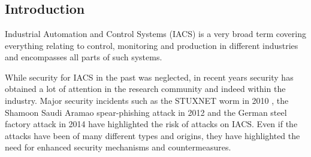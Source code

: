\chapter[\paperIVtitle]{\texorpdfstring{%
                \paperIVtitle}{%
                \paperIVtitle}}

\label{ch:digital-twin}
\paperRemark{\paperIVref}





\section{Introduction}
\label{sec:digital-twin:introduction}

Industrial Automation and Control Systems (IACS) is a very broad term covering everything relating to control, monitoring and production in different industries and encompasses all parts of such systems.

While security for IACS in the past was neglected, in recent years security has obtained a lot of attention in the research community and indeed within the industry. Major security incidents such as the STUXNET worm in 2010 \cite{Falliere2011}, the Shamoon Saudi Aramao spear-phishing attack in 2012 \cite{Leyden2012} and the German steel factory attack in 2014 \cite{Roberts2014} have highlighted the risk of attacks on IACS.  Even if the attacks have been of many different types and origins, they have highlighted the need for enhanced security mechanisms and countermeasures. 

